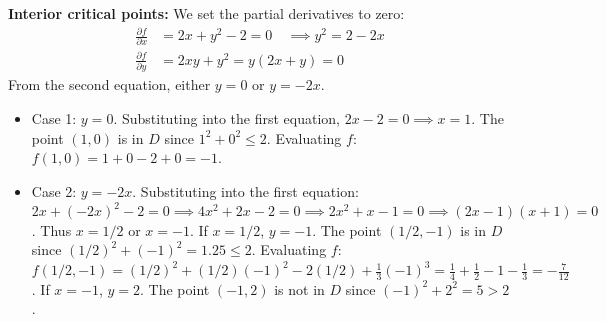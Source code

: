 \documentclass{article}
\begin{document}
\begin{enumerate}[label=\fbox{\arabic*}]
        \textbf{Interior critical points:}
        We set the partial derivatives to zero:
        \begin{align*}
          \frac{\partial f}{\partial x} &= 2x + y^2 - 2 = 0 \quad \implies y^2 = 2 - 2x \\
          \frac{\partial f}{\partial y} &= 2xy + y^2 = y(2x + y) = 0
        \end{align*}
        From the second equation, either $y = 0$ or $y = -2x$.
        \begin{itemize}
          \item Case 1: $y = 0$. Substituting into the first equation, $2x - 2 = 0 \implies x = 1$. The point $(1, 0)$ is in $D$ since $1^2 + 0^2 \le 2$.
          Evaluating $f$: $f(1, 0) = 1 + 0 - 2 + 0 = -1$.
          \item Case 2: $y = -2x$. Substituting into the first equation: $2x + (-2x)^2 - 2 = 0 \implies 4x^2 + 2x - 2 = 0 \implies 2x^2 + x - 1 = 0 \implies (2x - 1)(x + 1) = 0$.
          Thus $x = 1/2$ or $x = -1$.
          If $x = 1/2$, $y = -1$. The point $(1/2, -1)$ is in $D$ since $(1/2)^2 + (-1)^2 = 1.25 \le 2$.
          Evaluating $f$: $f(1/2, -1) = (1/2)^2 + (1/2)(-1)^2 - 2(1/2) + \frac{1}{3}(-1)^3 = \frac{1}{4} + \frac{1}{2} - 1 - \frac{1}{3} = -\frac{7}{12}$.
          If $x = -1$, $y = 2$. The point $(-1, 2)$ is not in $D$ since $(-1)^2 + 2^2 = 5 > 2$.
        \end{itemize}
        

\end{enumerate}
\end{document}
